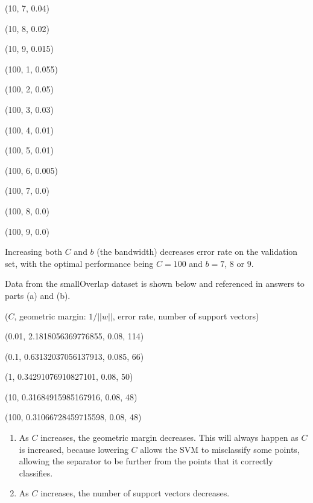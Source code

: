 \documentclass{paper}
\begin{document}
\begin{enumerate}
    (10, 7, 0.04)
    
    (10, 8, 0.02)
    
    (10, 9, 0.015)
    
    (100, 1, 0.055)
    
    (100, 2, 0.05)
    
    (100, 3, 0.03)
    
    (100, 4, 0.01)
    
    (100, 5, 0.01)
    
    (100, 6, 0.005)
    
    (100, 7, 0.0)
    
    (100, 8, 0.0)
    
    (100, 9, 0.0)

    Increasing both $C$ and $b$ (the bandwidth) decreases error rate on the validation set, with the optimal performance being $C=100$ and $b=7$, $8$ or $9$.

    Data from the smallOverlap dataset is shown below and referenced in answers to parts (a) and (b).

            ($C$, geometric margin: $1/||w||$, error rate, number of support vectors)
            
            (0.01, 2.1818056369776855, 0.08, 114)
            
            (0.1, 0.63132037056137913, 0.085, 66)
            
            (1, 0.34291076910827101, 0.08, 50)
            
            (10, 0.31684915985167916, 0.08, 48)
            
            (100, 0.31066728459715598, 0.08, 48)

    \begin{enumerate}

        \item

            As $C$ increases, the geometric margin decreases. This will always happen as $C$ is increased, because lowering $C$ allows the SVM to misclassify some points, allowing the separator to be further from the points that it correctly classifies. 

        \item

            As $C$ increases, the number of support vectors decreases.
    \end{enumerate}

\end{enumerate}
\end{document}
